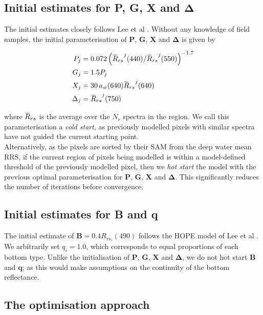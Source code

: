 \documentclass[12pt]{article}
\newcommand{\overbar}[1]{\mkern 1.5mu\overline{\mkern-1.5mu#1\mkern-1.5mu}\mkern 1.5mu}
\numberwithin{equation}{section}
\begin{document}
	\subsection{Initial estimates for \textbf{P}, \textbf{G}, \textbf{X} and $\mathbf{\Delta}$}\label{estimates_1}

The initial estimates closely follows Lee et al \cite{lee1999}. Without any knowledge of field 
samples, the initial parameterisation of \textbf{P}, \textbf{G}, \textbf{X} and $\mathbf{\Delta}$ 
is given by 
\begin{linenomath}
\begin{align*}
P_j &= 0.072 \left({\overbar{R}_{rs}}^j(440)/{\overbar{R}_{rs}}^j(550)\right)^{-1.7}\\
G_j &= 1.5 P_j \\
X_j &= 30\, a_w(640) {\overbar{R}_{rs}}^j(640) \\
\Delta_j &= {\overbar{R}_{rs}}^j(750)
\end{align*}
\end{linenomath}
where $\overbar{R}_{rs}$ is the average over the $N_r$ spectra in the region. We call this 
parameterisation a \textit{cold start}, as previously modelled pixels with similar spectra have 
not guided the current starting point. \\

Alternatively, as the pixels are sorted by their SAM from the deep water mean RRS, if the 
current region of pixels being modelled is within a model-defined threshold of the 
previously modelled pixel, then we \textit{hot start} the model with the previous optimal 
parameterisation for \textbf{P}, \textbf{G}, \textbf{X} and $\mathbf{\Delta}$. This 
significantly reduces the number of iterations before convergence. 

	\subsection{Initial estimates for \textbf{B} and \textbf{q}}\label{estimates_2}

The initial estimate of $\textbf{B} = 0.4 {R_{rs_i}}(490)$ follows the HOPE model of Lee 
et al \cite{dekker2011}. We arbitrarily set $q_i = 1.0$, which corresponds to equal 
proportions of each bottom type. Unlike the initialisation of \textbf{P}, \textbf{G}, 
\textbf{X} and $\mathbf{\Delta}$, we do not hot start \textbf{B} and $\textbf{q}$; 
as this would make assumptions on the continuity of the bottom reflectance. 

	\subsection{The optimisation approach}
\end{document}
